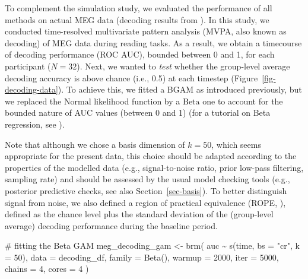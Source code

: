 \documentclass[
  doc,
  floatsintext,
  longtable,
  a4paper,
  nolmodern,
  notxfonts,
  notimes,
  donotrepeattitle,
  colorlinks=true,linkcolor=blue,citecolor=blue,urlcolor=blue]{apa7}
\newenvironment{Shaded}{\begin{snugshade}}{\end{snugshade}}
\newcommand{\AttributeTok}[1]{\textcolor[rgb]{0.40,0.45,0.13}{#1}}
\newcommand{\CommentTok}[1]{\textcolor[rgb]{0.37,0.37,0.37}{#1}}
\newcommand{\DecValTok}[1]{\textcolor[rgb]{0.68,0.00,0.00}{#1}}
\newcommand{\FunctionTok}[1]{\textcolor[rgb]{0.28,0.35,0.67}{#1}}
\newcommand{\NormalTok}[1]{\textcolor[rgb]{0.00,0.23,0.31}{#1}}
\newcommand{\OtherTok}[1]{\textcolor[rgb]{0.00,0.23,0.31}{#1}}
\newcommand{\SpecialCharTok}[1]{\textcolor[rgb]{0.37,0.37,0.37}{#1}}
\newcommand{\StringTok}[1]{\textcolor[rgb]{0.13,0.47,0.30}{#1}}
\begin{document}
To complement the simulation study, we evaluated the performance of all
methods on actual MEG data (decoding results from
). In
this study, we conducted time-resolved multivariate pattern analysis
(MVPA, also known as decoding) of MEG data during reading tasks. As a
result, we obtain a timecourse of decoding performance (ROC AUC),
bounded between 0 and 1, for each participant (\(N=32\)). Next, we
wanted to \emph{test} whether the group-level average decoding accuracy
is above chance (i.e., 0.5) at each timestep
(Figure~\ref{fig-decoding-data}). To achieve this, we fitted a BGAM as
introduced previously, but we replaced the \(\mathrm{Normal}\)
likelihood function by a \(\mathrm{Beta}\) one to account for the
bounded nature of AUC values (between 0 and 1) (for a tutorial on Beta
regression, see ).

Note that although we chose a basis dimension of \(k=50\), which seems
appropriate for the present data, this choice should be adapted
according to the properties of the modelled data (e.g., signal-to-noise
ratio, prior low-pass filtering, sampling rate) and should be assessed
by the usual model checking tools (e.g., posterior predictive checks,
see also Section~\ref{sec-basis}). To better distinguish signal from
noise, we also defined a region of practical equivalence (ROPE,
), defined as the
chance level plus the standard deviation of the (group-level average)
decoding performance during the baseline period.

\begin{Shaded}
\begin{Highlighting}[]
\CommentTok{\# fitting the Beta GAM}
\NormalTok{meg\_decoding\_gam }\OtherTok{\textless{}{-}} \FunctionTok{brm}\NormalTok{(}
\NormalTok{    auc }\SpecialCharTok{\textasciitilde{}} \FunctionTok{s}\NormalTok{(time, }\AttributeTok{bs =} \StringTok{"cr"}\NormalTok{, }\AttributeTok{k =} \DecValTok{50}\NormalTok{),}
    \AttributeTok{data =}\NormalTok{ decoding\_df,}
    \AttributeTok{family =} \FunctionTok{Beta}\NormalTok{(),}
    \AttributeTok{warmup =} \DecValTok{2000}\NormalTok{,}
    \AttributeTok{iter =} \DecValTok{5000}\NormalTok{,}
    \AttributeTok{chains =} \DecValTok{4}\NormalTok{,}
    \AttributeTok{cores =} \DecValTok{4}
\NormalTok{    )}
\end{Highlighting}
\end{Shaded}
\end{document}
